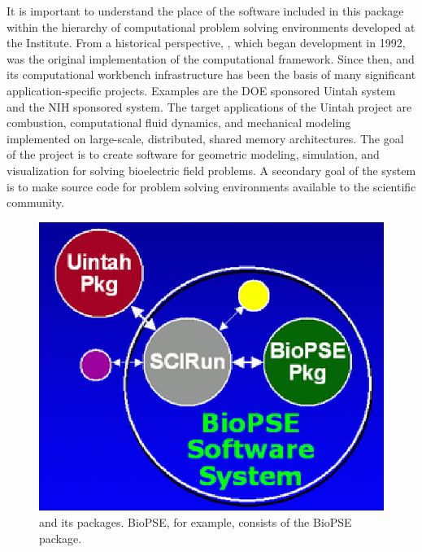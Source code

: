 \newcommand{\eabfig}{%
  \includegraphics{../FAQ/EAB-BioPSE.eps}
}
\begin{htmlonly}
  \newcommand{\eabfig}{%
    \htmladdimg[align=left,alt=""]{../../FAQ/EAB-BioPSE.gif}
  }
\end{htmlonly}

It is important to understand the place of the software included in
this package within the hierarchy of computational problem solving
environments developed at the \sci{} Institute.  From a historical
perspective, \SR{}, which began development in 1992, was the
original implementation of the computational
framework\cite{CRJ:Joh94c,RSM:Par95,RSM:Par95b,RSM:Par97,RSM:Par97b,CRJ:Parker99b}.
Since then, \SR{} and its computational workbench infrastructure has
been the basis of many significant application-specific projects. 
Examples are the DOE sponsored Uintah system \cite{RSM:Dav2000}
and the NIH sponsored \BIOPSE{} system.  The target applications of
the Uintah project are combustion, computational fluid dynamics, and
mechanical modeling implemented on large-scale, distributed, shared
memory architectures.  The goal of the \BIOPSE{} project is to create
software for geometric modeling, simulation, and visualization for
solving bioelectric field problems.  A secondary goal of
the \SR{} system is to make source code for  problem solving
environments available to the scientific community.

\begin{figure}[htb]
  \centering
  \begin{makeimage} \end{makeimage}
  \eabfig
  \caption{\label{fig:eab-BioPSE} \sr{} and its
    packages.  BioPSE, for example, consists of \sr{}
    the BioPSE package.}
\end{figure}

